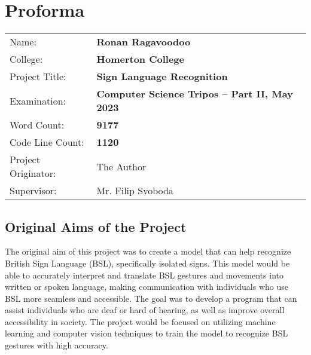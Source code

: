 \documentclass[final,rdr32.tex]{subfiles}
\begin{document}
\pagestyle{plain}

\chapter*{Proforma}

 {\large
  \begin{tabular}{ll}
      Name:               & \bf Ronan Ragavoodoo                             \\
      College:            & \bf Homerton College                             \\
      Project Title:      & \bf Sign Language Recognition                    \\
      Examination:        & \bf Computer Science Tripos -- Part II, May 2023 \\
      Word Count:         & \bf 9177\footnotemark[1]                         \\
      Code Line Count:    & \bf 1120\footnotemark[2]                         \\
      Project Originator: & The Author                                       \\
      Supervisor:         & Mr. Filip Svoboda                                \\
  \end{tabular}
 }


\section*{Original Aims of the Project}


The original aim of this project was to create a model that can help recognize British Sign Language (BSL), specifically isolated signs. This model would be able to accurately interpret and translate BSL gestures and movements into written or spoken language, making communication with individuals who use BSL more seamless and accessible. The goal was to develop a program that can assist individuals who are deaf or hard of hearing, as well as improve overall accessibility in society. The project would be focused on utilizing machine learning and computer vision techniques to train the model to recognize BSL gestures with high accuracy.
\end{document}
